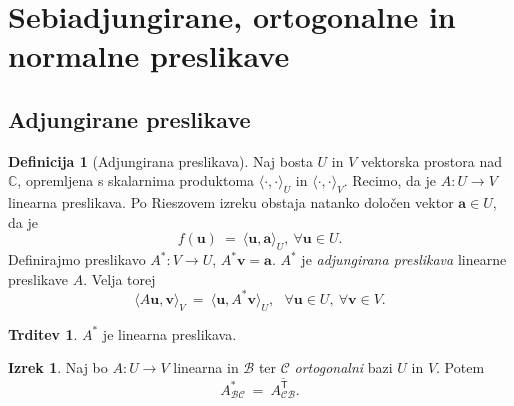 \documentclass[11pt]{article}
\renewcommand{\a}{\mathbf{a}}
\renewcommand{\u}{\mathbf{u}}
\newcommand{\vv}{\mathbf{v}}
\newcommand{\0}{\mathbf{0}}
\newcommand{\B}{\mathscr{B}}
\newcommand{\C}{\mathscr{C}}
\renewcommand{\sp}[2]{\langle #1, #2 \rangle}
\newcommand{\T}{\mathsf{T}}
\theoremstyle{definition}
\newtheorem{definicija}{Definicija}[section]
\theoremstyle{definition}
\newtheorem{trditev}{Trditev}[section]
\theoremstyle{definition}
\newtheorem{izrek}{Izrek}[section]
\theoremstyle{definition}
\begin{document}

\pagebreak


\section{Sebiadjungirane, ortogonalne in \\normalne preslikave}
\vspace{0.5cm}


\subsection{Adjungirane preslikave}
\vspace{0.5cm}

\begin{definicija}[Adjungirana preslikava]

Naj bosta $U$ in $V$ vektorska prostora nad $\mathbb{C}$, opremljena s skalarnima produktoma $\sp{\cdot}{\cdot}_U$ in $\sp{\cdot}{\cdot}_V$. Recimo, da je $A: U \rightarrow V$ linearna preslikava. Po Rieszovem izreku obstaja natanko določen vektor $\a \in U$, da je
$$f(\u) ~=~ \sp{\u}{\a}_U, ~\forall \u \in U.$$ Definirajmo preslikavo $A^*: V \rightarrow U$, $A^* \vv = \a$. $A^*$ je \textit{adjungirana preslikava} linearne preslikave $A$. Velja torej
$$\sp{A\u}{\vv}_V ~=~ \sp{\u}{A^* \vv}_U, ~~~\forall \u \in U, ~\forall \vv \in V.$$

\end{definicija}
\vspace{0.5cm}

\begin{trditev}

$A^*$ je linearna preslikava.

\end{trditev}
\vspace{0.5cm}

\begin{izrek}

Naj bo $A: U \rightarrow V$ linearna in $\B$ ter $\C$ \textit{ortogonalni} bazi $U$ in $V$. Potem 
$$A_{\B\C}^* ~=~ \overline{A_{\C\B}^\T}.$$

\end{izrek}
\vspace{0.5cm}
\end{document}
